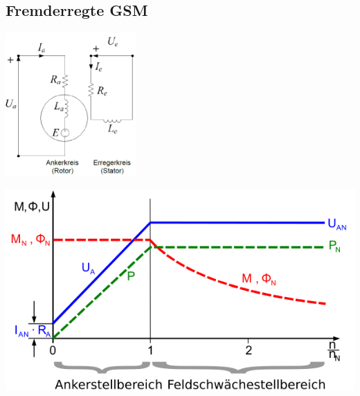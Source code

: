 \subsection{Fremderregte GSM}
\begin{minipage}[b]{0.5\textwidth}
   	\raggedright
   	\includegraphics[width=5cm]{images/Ersatzschaltbild_GSM.png}
\end{minipage}
\begin{minipage}[b]{0.5\textwidth}
   	\raggedright
   	\includegraphics[scale = 0.7]{images/KennlinieFremderregt}
\end{minipage}
